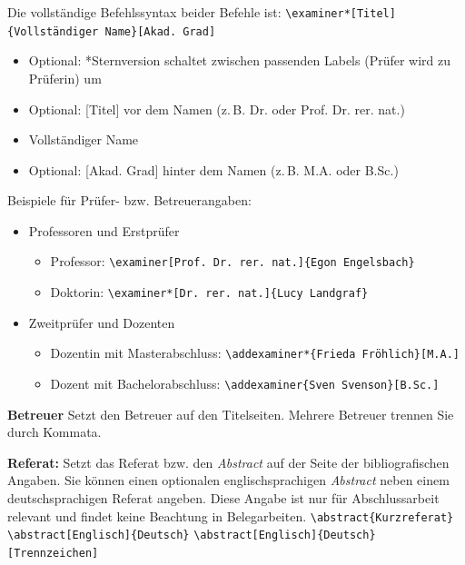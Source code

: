 Die vollständige Befehlssyntax beider Befehle ist:
	\newline
	\verb|\examiner*[Titel]{Vollständiger Name}[Akad. Grad]|
	\begin{itemize}
		\item Optional: *Sternversion schaltet zwischen passenden Labels (Prüfer wird zu Prüferin) um
		\item Optional: [Titel] vor dem Namen (z.\,B. Dr. oder Prof. Dr. rer. nat.)
		\item Vollständiger Name
		\item Optional: [Akad. Grad] hinter dem Namen (z.\,B. M.A. oder B.Sc.)
	\end{itemize}\vspace*{-\baselineskip}
	Beispiele für Prüfer- bzw. Betreuerangaben:
	\begin{itemize}
		\item Professoren und Erstprüfer
		\begin{itemize}
			\item Professor: \verb|\examiner[Prof. Dr. rer. nat.]{Egon Engelsbach}|
			\item Doktorin: \verb|\examiner*[Dr. rer. nat.]{Lucy Landgraf}|
		\end{itemize}
		\item Zweitprüfer und Dozenten
		\begin{itemize}
			\item Dozentin mit Masterabschluss: \verb|\addexaminer*{Frieda Fröhlich}[M.A.]|
			\item Dozent mit Bachelorabschluss: \verb|\addexaminer{Sven Svenson}[B.Sc.]|
		\end{itemize}
	\end{itemize}

\textbf{Betreuer}\label{cmd:betreuer}
Setzt den Betreuer auf den Titelseiten. Mehrere Betreuer trennen Sie durch Kommata.

\textbf{Referat:}\label{cmd:abstract}
	Setzt das Referat bzw. den \textit{Abstract} auf der Seite der bibliografischen Angaben.
	Sie können einen optionalen englischsprachigen \textit{Abstract} neben einem deutschsprachigen Referat angeben.
	Diese Angabe ist nur für Abschlussarbeit relevant und findet keine Beachtung in Belegarbeiten.
	\newline
	\verb|\abstract{Kurzreferat}|
	\newline
	\verb|\abstract[Englisch]{Deutsch}|
	\newline
	\verb|\abstract[Englisch]{Deutsch}[Trennzeichen]|
	
